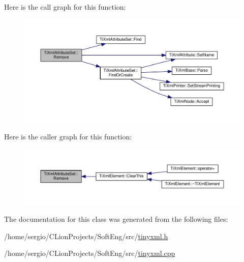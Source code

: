 Here is the call graph for this function\+:
\nopagebreak
\begin{figure}[H]
\begin{center}
\leavevmode
\includegraphics[width=350pt]{class_ti_xml_attribute_set_a924a73d071f2573f9060f0be57879c57_cgraph}
\end{center}
\end{figure}
Here is the caller graph for this function\+:
\nopagebreak
\begin{figure}[H]
\begin{center}
\leavevmode
\includegraphics[width=350pt]{class_ti_xml_attribute_set_a924a73d071f2573f9060f0be57879c57_icgraph}
\end{center}
\end{figure}


The documentation for this class was generated from the following files\+:\begin{DoxyCompactItemize}
\item 
/home/sergio/\+C\+Lion\+Projects/\+Soft\+Eng/src/\hyperlink{tinyxml_8h}{tinyxml.\+h}\item 
/home/sergio/\+C\+Lion\+Projects/\+Soft\+Eng/src/\hyperlink{tinyxml_8cpp}{tinyxml.\+cpp}\end{DoxyCompactItemize}
